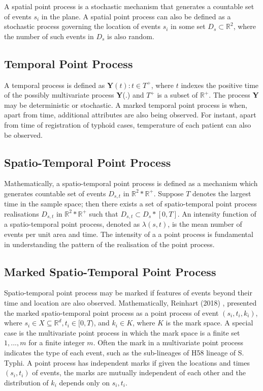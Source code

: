 \documentclass[a4paper]{thesis}
\begin{document}
A spatial point process is a stochastic mechanism that generates a countable
set of events $s_i$
in the plane.\cite{Diggle2014} A spatial point process can also be defined as a stochastic process governing the location of events ${s_i}$ in some set $D_s \subset \mathbb{R}^2$, where the number of such events in $D_s$ is also random. \cite{CressieWikle2011} 

\subsection{Temporal Point Process}

A temporal process is defined as ${\textbf{Y}(t): t \in T^+}$, where $t$ indexes the positive time of the possibly multivariate process \textbf{Y}(.) and $T^+$ is a subset of $\mathbb{R}^+$. The process \textbf{Y} may be deterministic or stochastic.\cite{CressieWikle2011} A marked temporal point process is when, apart from time, additional attributes are also being observed. For instant, apart from time of registration of typhoid cases, temperature of each patient can also be observed.\cite{CressieWikle2011}

\subsection{Spatio-Temporal Point Process}

Mathematically, a spatio-temporal point process is defined as a mechanism which generates countable set of events $D_{s,t}$ in  $\mathbb{R}^2 * \mathbb{R^+}$. Suppose $T$ denotes the largest time in the sample space; then there exists a set of spatio-temporal point process realisations $D_{s,t}$ in  $\mathbb{R}^2 * \mathbb{R^+}$ such that $D_{s,t} \subset D_s * [0,T]$.\cite{CressieWikle2011} An intensity function of a spatio-temporal point process, denoted as $\lambda (s,t)$, is the mean number of events per unit area and time. The intensity of a a point process is fundamental in understanding the pattern of the realisation of the point process.

\subsection{Marked Spatio-Temporal Point Process}

Spatio-temporal point process may be marked if features of events beyond their time and location are also observed. Mathematically, Reinhart (2018) \cite{Reinhart2018}, presented the marked spatio-temporal point process  as a point process of event ${(s_i,t_i,k_i)}$, where $s_i \in X \subseteq \mathbb{R}^d, t_i \in [0,T)$, and $k_i \in K$, where $K$ is the mark space. A special case is the multivariate point process in which the mark space is a finite set ${1,...,m}$ for a finite integer $m$. Often the mark in a multivariate point process indicates the type of each event, such as the sub-lineages of H58 lineage of S. Typhi. A point process has independent marks if given the locations and times ${(s_i,t_i)}$ of events, the marks are mutually independent of each other and the distribution of $k_i$ depends only on ${s_i,t_i}$.\cite{Reinhart2018}
\end{document}
